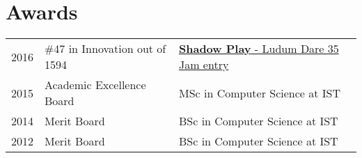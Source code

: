\documentclass[a4paper]{deedy-resume} %
\begin{document}
\begin{minipage}[t]{0.64\textwidth}
\begin{comment}
\section{Research}

\href{https://nunoxu.github.io/downloads/MSc_Trust_HAI.pdf}{\runsubsection{Trustful Action Suggestion\\ in Human Agent Interaction}}
\descript{| MSc Thesis}

\location{September 2015 - Nov 2016 (14 months) | IST - Lisbon, PT}
In order to increase \textbf{trustfulness} in \textbf{virtual agents}, this research aimed to create a module that will suggest actions to improve trust on the agent. To this end, a \textbf{cognitive trust model} was also being implemented.


\sectionspace %
\end{comment}

\begin{comment}

\section{Individual Work}

\runsubsection{Coderdojo@Técnico}
\descript{| Founder and Organizer}

\location{December 2014 - June 2015 (7 months) | IST - Lisbon, PT}
Was one of the founders of a \textbf{\href{https://coderdojo.com/}{Coderdojo}} branch in IST, which consisted in a monthly event meant to teach programming skills to children and teenagers.

\sectionspace %

\end{comment}


\section{Awards} 
\begin{tabular}{rll}
	2016	     & \#47 in Innovation out of 1594 & \href{http://ludumdare.com/compo/ludum-dare-35/?uid=90138}{\textbf{Shadow Play} - Ludum Dare 35 Jam entry}\\
    2015	     & Academic Excellence Board  & MSc in Computer Science at IST\\
	2014	     & Merit Board  & BSc in Computer Science at IST\\
	2012	     & Merit Board  & BSc in Computer Science at IST\\
\end{tabular}


\end{minipage}
\end{document}
